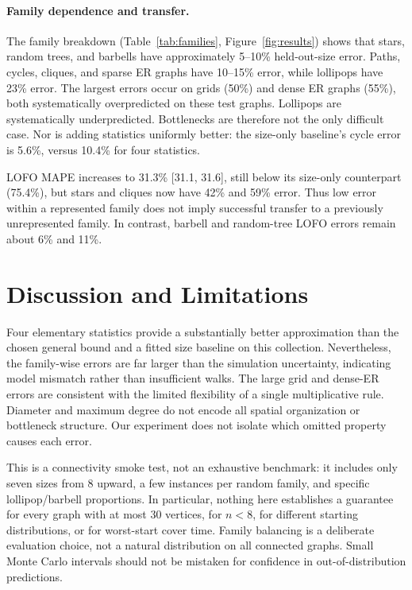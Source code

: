 \documentclass{article}
\begin{document}
\begin{table}[t]
\caption{MAPE (\%) by graph family for the four-statistic model.
Size-test brackets denote Monte Carlo 95\% intervals.
LOFO tests the entire omitted family over all seven sizes.}
\label{tab:families}
\centering\small

\end{table}

\paragraph{Family dependence and transfer.}
The family breakdown (Table~\ref{tab:families}, Figure~\ref{fig:results})
shows that stars, random trees, and barbells have approximately 5--10\%
held-out-size error. Paths, cycles, cliques, and sparse ER graphs have
10--15\% error, while lollipops have 23\% error. The largest errors occur
on grids (50\%) and dense ER graphs (55\%), both systematically
overpredicted on these test graphs. Lollipops are systematically
underpredicted. Bottlenecks are therefore not the only difficult case.
Nor is adding statistics uniformly better: the size-only baseline's
cycle error is 5.6\%, versus 10.4\% for four statistics.

LOFO MAPE increases to 31.3\% [31.1, 31.6], still below its size-only
counterpart (75.4\%), but stars and cliques now have 42\% and 59\% error.
Thus low error within a represented family does not imply successful
transfer to a previously unrepresented family. In contrast, barbell and
random-tree LOFO errors remain about 6\% and 11\%.

\section{Discussion and Limitations}
Four elementary statistics provide a substantially better approximation
than the chosen general bound and a fitted size baseline on this collection.
Nevertheless, the family-wise errors are far larger than the simulation
uncertainty, indicating model mismatch rather than insufficient walks.
The large grid and dense-ER errors are consistent with the limited
flexibility of a single multiplicative rule. Diameter and maximum degree
do not encode all spatial organization or bottleneck structure. Our
experiment does not isolate which omitted property causes each error.

This is a connectivity smoke test, not an exhaustive benchmark: it includes
only seven sizes from 8 upward, a few instances per random family, and
specific lollipop/barbell proportions. In particular, nothing here
establishes a guarantee for every graph with at most 30 vertices, for
$n<8$, for different starting distributions, or for worst-start cover
time. Family balancing is a deliberate evaluation choice, not a natural
distribution on all connected graphs. Small Monte Carlo intervals should
not be mistaken for confidence in out-of-distribution predictions.
\end{document}
